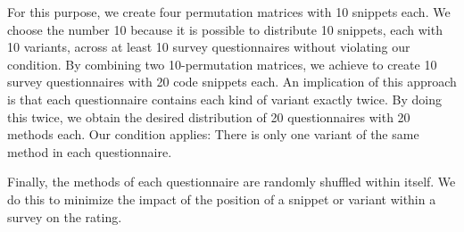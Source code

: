 \documentclass[%
class=scrreprt,
chapterprefix=false,%
open=right,%
twoside=false,%
paper=a4,%
logofile={Logo\_zentral\_farbig\_EN.png},%
thesistype=master,%
UKenglish,%
]{se2thesis}
\theoremstyle{definition}
\newcommand{\rdh}{REDEC\xspace}
\begin{document}
	For this purpose, we create four permutation matrices with 10 snippets each. We choose the number 10 because it is possible to distribute 10 snippets, each with 10 variants, across at least 10 survey questionnaires without violating our condition. By combining two 10-permutation matrices, we achieve to create 10 survey questionnaires with 20 code snippets each. An implication of this approach is that each questionnaire contains each kind of variant exactly twice. By doing this twice, we obtain the desired distribution of 20 questionnaires with 20 methods each. Our condition applies: There is only one variant of the same method in each questionnaire.
		
	Finally, the methods of each questionnaire are randomly shuffled within itself. We do this to minimize the impact of the position of a snippet or variant within a survey on the rating.

	
\end{document}
